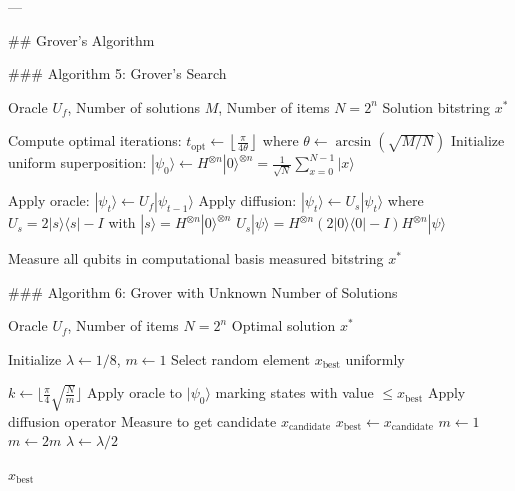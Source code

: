 ---

## Grover's Algorithm

### Algorithm 5: Grover's Search

\begin{algorithm}
\caption{Grover's Search Algorithm}
\begin{algorithmic}[1]
\REQUIRE Oracle $U_f$, Number of solutions $M$, Number of items $N = 2^n$
\ENSURE Solution bitstring $x^*$

\STATE Compute optimal iterations: $t_{\text{opt}} \gets \left\lfloor \frac{\pi}{4\theta} \right\rfloor$ where $\theta \gets \arcsin(\sqrt{M/N})$
\STATE Initialize uniform superposition: $|\psi_0\rangle \gets H^{\otimes n} |0\rangle^{\otimes n} = \frac{1}{\sqrt{N}} \sum_{x=0}^{N-1} |x\rangle$

    \STATE Apply oracle: $|\psi_t\rangle \gets U_f |\psi_{t-1}\rangle$
    \STATE Apply diffusion: $|\psi_t\rangle \gets U_s |\psi_t\rangle$
    \STATE \quad where $U_s = 2|s\rangle\langle s| - I$ with $|s\rangle = H^{\otimes n}|0\rangle^{\otimes n}$
    \STATE \quad $U_s |\psi\rangle = H^{\otimes n} (2|0\rangle\langle 0| - I) H^{\otimes n} |\psi\rangle$
\ENDFOR

\STATE Measure all qubits in computational basis
\RETURN measured bitstring $x^*$
\end{algorithmic}
\end{algorithm}

### Algorithm 6: Grover with Unknown Number of Solutions

\begin{algorithm}
\caption{Adaptive Grover's Search (Dürr-Høyer Minimum Finding)}
\begin{algorithmic}[1]
\REQUIRE Oracle $U_f$, Number of items $N = 2^n$
\ENSURE Optimal solution $x^*$

\STATE Initialize $\lambda \gets 1/8$, $m \gets 1$
\STATE Select random element $x_{\text{best}}$ uniformly

    \STATE $k \gets \lfloor \frac{\pi}{4} \sqrt{\frac{N}{m}} \rfloor$
        \STATE Apply oracle to $|\psi_0\rangle$ marking states with value $\leq x_{\text{best}}$
        \STATE Apply diffusion operator
    \ENDFOR
    \STATE Measure to get candidate $x_{\text{candidate}}$
        \STATE $x_{\text{best}} \gets x_{\text{candidate}}$
        \STATE $m \gets 1$
    \ELSE
        \STATE $m \gets 2m$
    \ENDIF
    \STATE $\lambda \gets \lambda/2$
\ENDWHILE

\RETURN $x_{\text{best}}$
\end{algorithmic}
\end{algorithm}

